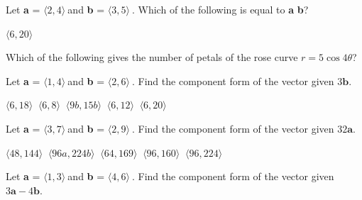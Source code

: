 \documentclass[addpoints]{exam}
\begin{document}
\begin{questions}
    \question[1] Let \textbf{a} = $\big \langle 2, 4 \big \rangle\ $and \textbf{b} = $\big \langle 3, 5 \big \rangle\ $. Which of the following is equal to \textbf{a} \cdot \textbf{b}?

    \begin{oneparchoices}
        \choice $\big \langle 6, 20 \big \rangle\ $
        \end{oneparchoices}  \answerline
    
    \question[1] Which of the following gives the number of petals of the rose curve $r = 5\cos4\theta$?
    
    \begin{oneparchoices}
        \end{oneparchoices}  \answerline
    
    \question[1] Let \textbf{a} = $\big \langle 1, 4 \big \rangle\ $and \textbf{b} = $\big \langle 2, 6 \big \rangle\ $. Find the component form of the vector given $3\textbf{b}$.
    
    \begin{oneparchoices}
        \choice $\big \langle 6, 18 \big \rangle\ $
        \choice $\big \langle 6, 8 \big \rangle\ $
        \choice $\big \langle 9b, 15b \big \rangle\ $
        \choice $\big \langle 6, 12 \big \rangle\ $
        \choice $\big \langle 6, 20 \big \rangle\ $
        \end{oneparchoices}  \answerline
    
    \question[1] Let \textbf{a} = $\big \langle 3, 7 \big \rangle\ $and \textbf{b} = $\big \langle 2, 9 \big \rangle\ $. Find the component form of the vector given $32\textbf{a}$.
    
    \begin{oneparchoices}
        \choice $\big \langle 48, 144 \big \rangle\ $
        \choice $\big \langle 96a, 224b \big \rangle\ $
        \choice $\big \langle 64, 169 \big \rangle\ $
        \choice $\big \langle 96, 160 \big \rangle\ $
        \choice $\big \langle 96, 224 \big \rangle\ $
        \end{oneparchoices}  \answerline
    
    \question[1] Let \textbf{a} = $\big \langle 1, 3 \big \rangle\ $and \textbf{b} = $\big \langle 4, 6 \big \rangle\ $. Find the component form of the vector given $3\textbf{a} - 4\textbf{b}$.
    

\end{questions}
\end{document}
